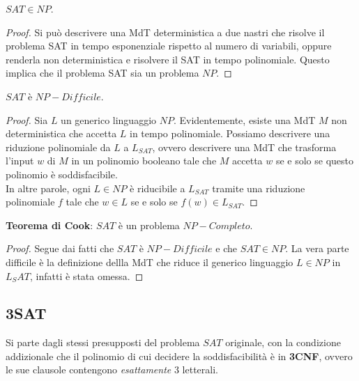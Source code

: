 \begin{lemm}
	$SAT \in NP$.
\end{lemm}

\begin{proof}
	Si può descrivere una MdT deterministica a due nastri che risolve il problema SAT in tempo esponenziale rispetto al numero di variabili, oppure renderla non deterministica e risolvere il SAT in tempo polinomiale. Questo implica che il problema SAT sia un problema $NP$.
\end{proof}

\vspace{0.4cm}

\begin{lemm}
	$SAT$ è $NP-Difficile$.
\end{lemm}

\begin{proof}
	Sia $L$ un generico linguaggio $NP$. Evidentemente, esiste una MdT $M$ non deterministica che accetta $L$ in tempo polinomiale. Possiamo descrivere una riduzione polinomiale da $L$ a $L_{SAT}$, ovvero descrivere una MdT che trasforma l'input $w$ di $M$ in un polinomio booleano tale che $M$ accetta $w$ se e solo se questo polinomio è soddisfacibile. \\ In altre parole, ogni $L \in NP$ è riducibile a $L_{SAT}$ tramite una riduzione polinomiale $f$ tale che $w \in L$ se e solo se $f(w) \in L_{SAT}$.
\end{proof}

\vspace{0.4cm}

\begin{lemm}
	\textbf{Teorema di Cook}: $SAT$ è un problema $NP-Completo$.
\end{lemm}

\begin{proof}
	Segue dai fatti che $SAT$ è $NP-Difficile$ e che $SAT \in NP$. La vera parte difficile è la definizione dellla MdT che riduce il generico linguaggio $L \in NP$ in $L_SAT$, infatti è stata omessa.
\end{proof}

\subsection{3SAT}

Si parte dagli stessi presupposti del problema $SAT$ originale, con la condizione addizionale che il polinomio di cui decidere la soddisfacibilità è in \textbf{3CNF}, ovvero le sue clausole contengono \textit{esattamente} 3 letterali.

